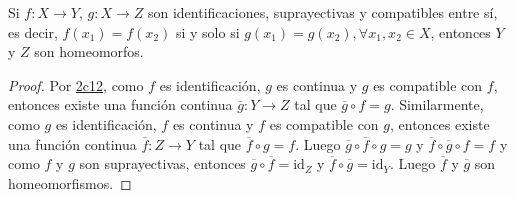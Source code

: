 
\begin{corollary}
Si $f : X \longrightarrow Y$, $g : X \longrightarrow Z$ son identificaciones, suprayectivas y compatibles entre sí, es decir, $f(x_1) = f(x_2)$ si y solo si $g(x_1) = g(x_2), \forall x_1, x_2 \in X$, entonces $Y$ y $Z$ son homeomorfos.
\end{corollary}

\begin{proof}
Por \hyperref[card:2c12]{\textsf{2c12}}, como $f$ es identificación, $g$ es continua y $g$ es compatible con $f$, entonces existe una función continua $\overline{g} : Y \longrightarrow Z$ tal que $\overline{g} \circ f = g$. Similarmente, como $g$ es identificación, $f$ es continua y $f$ es compatible con $g$, entonces existe una función continua $\overline{f} : Z \longrightarrow Y$ tal que $\overline{f} \circ g = f$. Luego $\overline{g} \circ \overline{f} \circ g = g$ y $\overline{f} \circ \overline{g} \circ f = f$ y como $f$ y $g$ son suprayectivas, entonces $\overline{g} \circ \overline{f} = \text{id}_{Z}$ y $\overline{f} \circ \overline{g} =  \text{id}_{Y}$. Luego $\overline{f}$ y $\overline{g}$ son homeomorfismos.
\end{proof}
